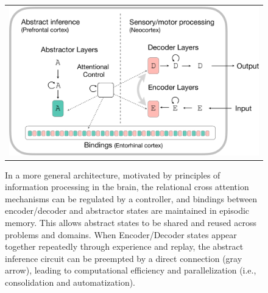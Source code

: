 \begin{figure}[t]
    \vspace{-3mm}
    \begin{center}
    \begin{tabular}{c}
        \hskip2pt\includegraphics[width=.60\textwidth]{figures/algorithm-diagram2-crop} 
    \end{tabular}
    \caption{In a more general architecture, motivated by principles of information processing 
    in the brain, the relational cross attention mechanisms can be regulated by a controller, and bindings between encoder/decoder and abstractor states are maintained in episodic memory. This allows abstract states to be shared and reused across problems and domains. When Encoder/Decoder states appear together repeatedly through experience and replay, the abstract inference circuit can be preempted by a direct connection (gray arrow), leading to computational efficiency and parallelization (i.e., consolidation and automatization).
    }
    \label{fig:algo2}
    \vskip-12pt
    \end{center}
\end{figure}


